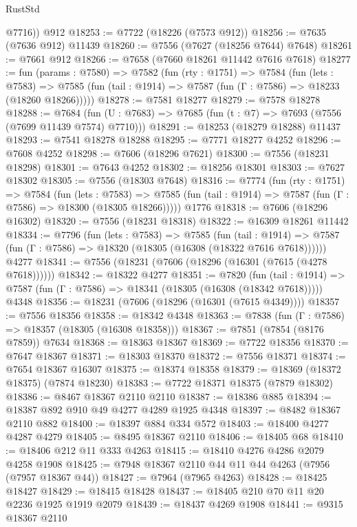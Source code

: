 \begin{lexlean}{RustStd}
\begin{coremodule}
        @7716))
    @912
@18253 := @7722 (@18226 (@7573 @912))
@18256 := @7635 (@7636 @912) @11439
@18260 := @7556 (@7627 (@18256 @7644) @7648)
@18261 := @7661 @912
@18266 := @7658 (@7660 @18261 @11442 @7616 @7618)
@18277 := fun (params : @7580) =>
  @7582
    (fun (rty : @1751) =>
    @7584
      (fun (lets : @7583) =>
      @7585 (fun (tail : @1914) => @7587 (fun (Γ : @7586) => @18233 (@18260 @18266)))))
@18278 := @7581 @18277
@18279 := @7578 @18278
@18288 := @7684
    (fun (U : @7683) => @7685 (fun (t : @7) => @7693 (@7556 (@7699 @11439 @7574) @7710)))
@18291 := @18253 (@18279 @18288) @11437
@18293 := @7541 @18278 @18288
@18295 := @7771 @18277 @4252
@18296 := @7608 @4252
@18298 := @7606 (@18296 @7621)
@18300 := @7556 (@18231 @18298)
@18301 := @7643 @4252
@18302 := @18256 @18301
@18303 := @7627 @18302
@18305 := @7556 (@18303 @7648)
@18316 := @7774
    (fun (rty : @1751) =>
    @7584
      (fun (lets : @7583) =>
      @7585 (fun (tail : @1914) => @7587 (fun (Γ : @7586) => @18300 (@18305 @18266)))))
    @1776
@18318 := @7606 (@18296 @16302)
@18320 := @7556 (@18231 @18318)
@18322 := @16309 @18261 @11442
@18334 := @7796
    (fun (lets : @7583) =>
    @7585
      (fun (tail : @1914) =>
      @7587 (fun (Γ : @7586) => @18320 (@18305 (@16308 (@18322 @7616 @7618))))))
    @4277
@18341 := @7556 (@18231 (@7606 (@18296 (@16301 (@7615 (@4278 @7618))))))
@18342 := @18322 @4277
@18351 := @7820
    (fun (tail : @1914) => @7587 (fun (Γ : @7586) => @18341 (@18305 (@16308 (@18342 @7618)))))
    @4348
@18356 := @18231 (@7606 (@18296 (@16301 (@7615 @4349))))
@18357 := @7556 @18356
@18358 := @18342 @4348
@18363 := @7838 (fun (Γ : @7586) => @18357 (@18305 (@16308 @18358)))
@18367 := @7851 (@7854 (@8176 @7859)) @7634
@18368 := @18363 @18367
@18369 := @7722 @18356
@18370 := @7647 @18367
@18371 := @18303 @18370
@18372 := @7556 @18371
@18374 := @7654 @18367 @16307
@18375 := @18374 @18358
@18379 := @18369 (@18372 @18375) (@7874 @18230)
@18383 := @7722 @18371 @18375 (@7879 @18302)
@18386 := @8467 @18367 @2110 @2110
@18387 := @18386 @885
@18394 := @18387 @892 @910 @49 @4277 @4289 @1925 @4348
@18397 := @8482 @18367 @2110 @882
@18400 := @18397 @884 @334 @572
@18403 := @18400 @4277 @4287 @4279
@18405 := @8495 @18367 @2110
@18406 := @18405 @68
@18410 := @18406 @212 @11 @333 @4263
@18415 := @18410 @4276 @4286 @2079 @4258 @1908
@18425 := @7948 @18367 @2110 @44 @11 @44 @4263 (@7956 (@7957 @18367 @44))
@18427 := @7964 (@7965 @4263)
@18428 := @18425 @18427
@18429 := @18415 @18428
@18437 := @18405 @210 @70 @11 @20 @2236 @1925 @1919 @2079
@18439 := @18437 @4269 @1908
@18441 := @9315 @18367 @2110

\end{coremodule}
\end{lexlean}
